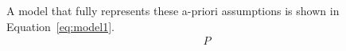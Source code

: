A model that fully represents these a-priori assumptions is shown in Equation~\ref{eq:model1}.
\begin{align}
    P
\end{align}
